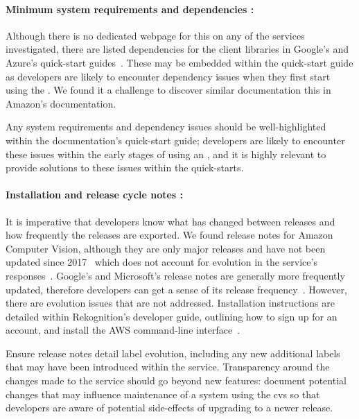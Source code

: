 \paragraph{Minimum system requirements and dependencies :} Although there is no dedicated webpage for this on any of the services investigated, there are listed dependencies for the client libraries in Google's and Azure's quick-start guides~. These may be embedded within the quick-start guide as developers are likely to encounter dependency issues when they first start using the . We found it a challenge to discover similar documentation this in Amazon's documentation.

\begin{leftbar}
\SuggestedImprovement
Any system requirements and dependency issues should be well-highlighted within the documentation's quick-start guide; developers are likely to encounter these issues within the early stages of using an , and it is highly relevant to provide solutions to these issues within the quick-starts.
\end{leftbar}

\paragraph{Installation and release cycle notes :} It is imperative that developers know what has changed between releases and how frequently the releases are exported. We found release notes for Amazon Computer Vision, although they are only major releases and have not been updated since 2017~ which does not account for evolution in the service's responses~\citep{Cummaudo:2019icsme}. Google's and Microsoft's release notes are generally more frequently updated, therefore developers can get a sense of its release frequency~. However, there are evolution issues that are not addressed. Installation instructions are detailed within Rekognition's developer guide, outlining how to sign up for an account, and install the AWS command-line interface~.

\begin{leftbar}
\SuggestedImprovement
Ensure release notes detail label evolution, including any new additional labels that may have been introduced within the service. Transparency around the changes made to the service should go beyond new features: document potential changes that may influence maintenance of a system using the \gls{cvs} so that developers are aware of potential side-effects of upgrading to a newer release.
\end{leftbar}


